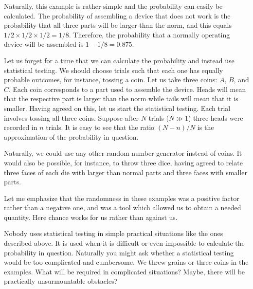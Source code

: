 Naturally, this example is rather simple and the probability can easily
be calculated. The probability of assembling a device that does not work
is the probability that all three parts will be larger than the norm, and
this equals $1/2 \times 1/2 \times 1/2 = 1/8$. Therefore, the probability that
a normally operating device will be assembled is $1 - 1/8 = 0.875$.

Let us forget for a time that we can calculate the probability and
instead use statistical testing. We should choose trials such that each
one has equally probable outcomes, for instance, tossing a coin. Let us
take three coins: $A$, $B$, and $C$. Each coin corresponds to a part used to
assemble the device. Heads will mean that the respective part is larger
than the norm while tails will mean that it is smaller. Having agreed on
this, let us start the statistical testing. Each trial involves tossing all
three coins. Suppose after $N$ trials ($N \gg 1$) three heads were recorded in
$n$ trials. It is easy to see that the ratio $(N - n)/N$ is the approximation of
the probability in question.

Naturally, we could use any other random number generator instead
of coins. It would also be possible, for instance, to throw three dice,
having agreed to relate three faces of each die with larger than normal
parts and three faces with smaller parts.

Let me emphasize that the randomness in these examples was
a positive factor rather than a negative one, and was a tool which
allowed us to obtain a needed quantity. Here chance works for us rather
than against us.

 Nobody uses statistical
testing in simple practical situations like the ones described above. It is
used when it is difficult or even impossible to calculate the probability
in question. Naturally you might ask whether a statistical testing would
be too complicated and cumbersome. We threw grains or three coins in
the examples. What will be required in complicated situations? Maybe,
there will be practically unsurmountable obstacles?

